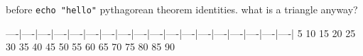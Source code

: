 \begin{myenv}
	before
	\texttt{echo "hello"}
	pythagorean theorem identities. what is a triangle anyway?
\end{myenv}
----|----|----|----|----|----|----|----|----|----|----|----|----|----|----|----|----|----|
   5   10   15   20   25   30   35   40   45   50   55   60   65   70   75   80   85   90
